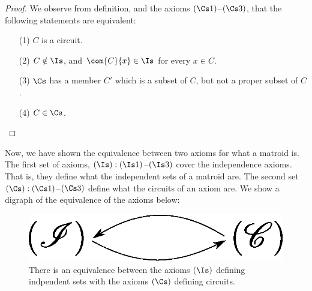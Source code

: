 \begin{proof}
  We observe from definition, and the axioms $(\Cs1)$--$(\Cs3)$, that
  the following statements are equivalent:
  \begin{enumerate}
    \item[(1)] $C$ is a circuit.

    \item [(2)] $C \notin \Is$, and $\com{C}{x} \in \Is$ for every $x
      \in C$.

    \item[(3)] $\Cs$ has a member $C'$ which is a subset of $C$, but
      not a proper subset of $C$.

    \item[(4)] $C \in \Cs$.
  \end{enumerate}
\end{proof}

Now, we have shown the equivalence between two axioms for what a
matroid is. The first set of axioms, $(\Is):(\Is1)$--$(\Is3)$ cover the
independence axioms. That is, they define what the independent sets of
a matroid are. The second set $(\Cs):(\Cs1)$--$(\Cs3)$ define what the
circuits of an axiom are. We show a digraph of the equivalence of the
axioms below:
\begin{figure}[h]
  \centering
  \includegraphics[scale=0.5]{figures/Chapter1/equiv_def_1.eps}
  \caption{There is an equivalence between the axioms $(\Is)$ defining
  indpendent sets with the axioms $(\Cs)$ defining circuits.}
  \label{figure_1.1}
\end{figure}
